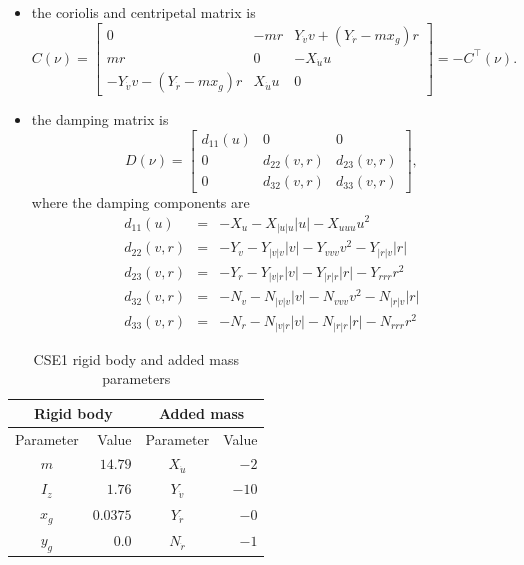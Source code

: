 \documentclass[a4paper,twoside,english]{report}
\providecommand{\tabularnewline}{\\}
\begin{document}
\begin{itemize}
\item the coriolis and centripetal matrix is
\[
C\left(\nu\right)=\left[\begin{array}{ccc}
0 & -mr & Y_{\dot{v}}v+\left(Y_{\dot{r}}-mx_{g}\right)r\\
mr & 0 & -X_{\dot{u}}u\\
-Y_{\dot{v}}v-\left(Y_{\dot{r}}-mx_{g}\right)r & X_{\dot{u}}u & 0
\end{array}\right]=-C^{\top}\left(\nu\right).
\]
\item the damping matrix is
\[
D\left(\nu\right)=\left[\begin{array}{ccc}
d_{11}\left(u\right) & 0 & 0\\
0 & d_{22}\left(v,r\right) & d_{23}\left(v,r\right)\\
0 & d_{32}\left(v,r\right) & d_{33}\left(v,r\right)
\end{array}\right],
\]
where the damping components are 
\begin{eqnarray}
d_{11}\left(u\right) & = & -X_{u}-X_{\left\vert u\right\vert u}\left\vert u\right\vert -X_{uuu}u^{2}\label{Eq:d11}\\
d_{22}\left(v,r\right) & = & -Y_{v}-Y_{\left\vert v\right\vert v}\left\vert v\right\vert -Y_{vvv}v^{2}-Y_{\left\vert r\right\vert v}\left\vert r\right\vert \label{Eq:d22}\\
d_{23}\left(v,r\right) & = & -Y_{r}-Y_{\left\vert v\right\vert r}\left\vert v\right\vert -Y_{\left\vert r\right\vert r}\left\vert r\right\vert -Y_{rrr}r^{2}\label{Eq:d23}\\
d_{32}\left(v,r\right) & = & -N_{v}-N_{\left\vert v\right\vert v}\left\vert v\right\vert -N_{vvv}v^{2}-N_{\left\vert r\right\vert v}\left\vert r\right\vert \label{Eq:d32}\\
d_{33}\left(v,r\right) & = & -N_{r}-N_{\left\vert v\right\vert r}\left\vert v\right\vert -N_{\left\vert r\right\vert r}\left\vert r\right\vert -N_{rrr}r^{2}\label{Eq:d33}
\end{eqnarray}
\end{itemize}

\begin{table}
\begin{centering}
\begin{tabular}{crcr}
\multicolumn{2}{c}{Rigid body} & \multicolumn{2}{c}{Added mass}\tabularnewline
\midrule 
Parameter & Value & Parameter & Value\tabularnewline
\midrule 
$m$  & $14.79$  & $X_{\dot{u}}$  & $-2$ \tabularnewline
$I_{z}$  & $1.76$  & $Y_{\dot{v}}$  & $-10$ \tabularnewline
$x_{g}$  & $0.0375$  & $Y_{\dot{r}}$  & $-0$ \tabularnewline
$y_{g}$  & $0.0$  & $N_{\dot{r}}$  & $-1$ \tabularnewline
\bottomrule
\end{tabular}
\par\end{centering}
\caption{\label{tab: CSE1-rigid-body}CSE1 rigid body and added mass parameters}
\end{table}
\end{document}
